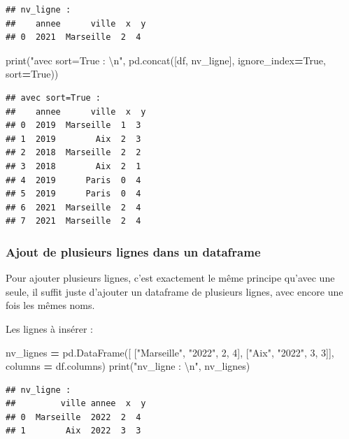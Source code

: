 \documentclass[
  12pt,
]{book}
\newenvironment{Shaded}{\begin{snugshade}}{\end{snugshade}}
\newcommand{\BuiltInTok}[1]{#1}
\newcommand{\CharTok}[1]{\textcolor[rgb]{0.31,0.60,0.02}{#1}}
\newcommand{\DecValTok}[1]{\textcolor[rgb]{0.00,0.00,0.81}{#1}}
\newcommand{\NormalTok}[1]{#1}
\newcommand{\OperatorTok}[1]{\textcolor[rgb]{0.81,0.36,0.00}{\textbf{#1}}}
\newcommand{\StringTok}[1]{\textcolor[rgb]{0.31,0.60,0.02}{#1}}
\newcommand{\VariableTok}[1]{\textcolor[rgb]{0.00,0.00,0.00}{#1}}
\numberwithin{equation}{section}
\numberwithin{countremarque}{section}
\begin{document}
\begin{lstlisting}
## nv_ligne : 
##    annee      ville  x  y
## 0  2021  Marseille  2  4
\end{lstlisting}

\begin{Shaded}
\begin{Highlighting}[]
\BuiltInTok{print}\NormalTok{(}\StringTok{"avec sort=True : }\CharTok{\textbackslash{}n}\StringTok{"}\NormalTok{, }
\NormalTok{  pd.concat([df, nv\_ligne], ignore\_index}\OperatorTok{=}\VariableTok{True}\NormalTok{, sort}\OperatorTok{=}\VariableTok{True}\NormalTok{))}
\end{Highlighting}
\end{Shaded}

\begin{lstlisting}
## avec sort=True : 
##    annee      ville  x  y
## 0  2019  Marseille  1  3
## 1  2019        Aix  2  3
## 2  2018  Marseille  2  2
## 3  2018        Aix  2  1
## 4  2019      Paris  0  4
## 5  2019      Paris  0  4
## 6  2021  Marseille  2  4
## 7  2021  Marseille  2  4
\end{lstlisting}

\subsubsection{Ajout de plusieurs lignes dans un dataframe}\label{ajout-de-plusieurs-lignes-dans-un-dataframe}

Pour ajouter plusieurs lignes, c'est exactement le même principe qu'avec une seule, il suffit juste d'ajouter un dataframe de plusieurs lignes, avec encore une fois les mêmes noms.

Les lignes à insérer :

\begin{Shaded}
\begin{Highlighting}[]
\NormalTok{nv\_lignes }\OperatorTok{=}\NormalTok{ pd.DataFrame([}
\NormalTok{    [}\StringTok{"Marseille"}\NormalTok{, }\StringTok{"2022"}\NormalTok{, }\DecValTok{2}\NormalTok{, }\DecValTok{4}\NormalTok{],}
\NormalTok{    [}\StringTok{"Aix"}\NormalTok{, }\StringTok{"2022"}\NormalTok{, }\DecValTok{3}\NormalTok{, }\DecValTok{3}\NormalTok{]],}
\NormalTok{    columns }\OperatorTok{=}\NormalTok{ df.columns)}
\BuiltInTok{print}\NormalTok{(}\StringTok{"nv\_ligne : }\CharTok{\textbackslash{}n}\StringTok{"}\NormalTok{, nv\_lignes)}
\end{Highlighting}
\end{Shaded}

\begin{lstlisting}
## nv_ligne : 
##         ville annee  x  y
## 0  Marseille  2022  2  4
## 1        Aix  2022  3  3
\end{lstlisting}
\end{document}
